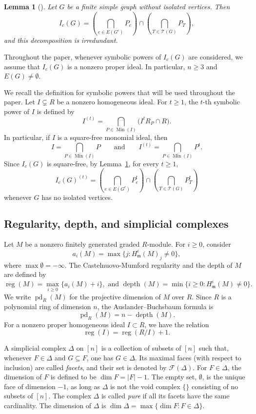 \documentclass[12pt]{amsart}
\newtheorem{lemma}[proposition]{Lemma}
\DeclareMathOperator{\depth}{depth}
\DeclareMathOperator{\pd}{pd}
\DeclareMathOperator{\reg}{reg}
\DeclareMathOperator{\Min}{Min}
\begin{document}
\begin{lemma}[{\cite[Theorem~2.1]{fm25}}]\label{lm:primary-decomposition}
Let \(G\) be a finite simple graph without isolated vertices. Then
\[
I_c(G)
=
\left(\bigcap_{e\in E(G^c)}P_e\right)
\cap
\left(\bigcap_{T\in\mathcal T(G)}P_T\right),
\]
and this decomposition is irredundant.
\end{lemma}

Throughout the paper, whenever symbolic powers of \(I_c(G)\) are considered, we assume that
\(I_c(G)\) is a nonzero proper ideal. In particular, \(n\geq3\) and \(E(G)\neq\emptyset\).


We recall the definition for symbolic powers that will be used throughout the paper. Let \(I\subsetneq R\) be a nonzero homogeneous ideal. For \(t\ge1\), the \(t\)-th symbolic power of \(I\) is defined by
\[
I^{(t)}
=
\bigcap_{P\in\Min(I)}
\bigl(I^tR_P\cap R\bigr).
\]
In particular, if \(I\) is a square-free monomial ideal, then
\[
I=\bigcap_{P\in\Min(I)}P
\qquad\text{and}\qquad
I^{(t)}=\bigcap_{P\in\Min(I)}P^t.
\]
Since \(I_c(G)\) is square-free, by  Lemma~\ref{lm:primary-decomposition}, for every \(t\ge1\),
\[
I_c(G)^{(t)}
=
\left(\bigcap_{e\in E(G^c)}P_e^t\right)
\cap
\left(\bigcap_{T\in\mathcal T(G)}P_T^t\right)
\]
whenever \(G\) has no isolated vertices.

\subsection{Regularity, depth, and simplicial complexes}

Let \(M\) be a nonzero finitely generated graded \(R\)-module. For \(i\ge0\), consider
\[
a_i(M)=\max\{j:H^i_{\mathfrak m}(M)_j\ne0\},
\]
where \(\max\emptyset=-\infty\). The Castelnuovo-Mumford regularity and  the depth of \(M\) are defined by
\[
\reg(M)=\max_{i\ge0}\{a_i(M)+i\}, \text{ and }
\depth(M)
=
\min\{i\ge0:H^i_{\mathfrak m}(M)\ne0\}.
\]
We write \(\pd_R(M)\) for the projective dimension of \(M\) over \(R\). Since \(R\) is a polynomial ring of dimension \(n\), the Auslander--Buchsbaum formula is
\[
\pd_R(M)=n-\depth(M).
\]
For a nonzero proper homogeneous ideal \(I\subset R\), we have the relation
\[
\reg(I)=\reg(R/I)+1.
\]

A simplicial complex $\Delta$ on $[n]$ is a collection of subsets of $[n]$ such that, whenever $F\in\Delta$ and $G\subseteq F$, one has $G\in\Delta$. Its maximal faces (with respect to inclusion) are called \emph{facets}, and their set is denoted by \(\mathcal F(\Delta)\). For $F \in \Delta$, the dimension of $F$ is defined to be $\dim F = |F| - 1$. The empty set, $\emptyset$, is the unique face of dimension $-1$, as long as $\Delta$ is not the void complex $\{ \}$ consisting of no subsets of \([n]\). The complex \(\Delta\) is called \emph{pure} if all its facets have the same cardinality. The dimension of \(\Delta\) is $\dim \Delta = \max \{ \dim F \colon F \in \Delta \}$.
\end{document}

